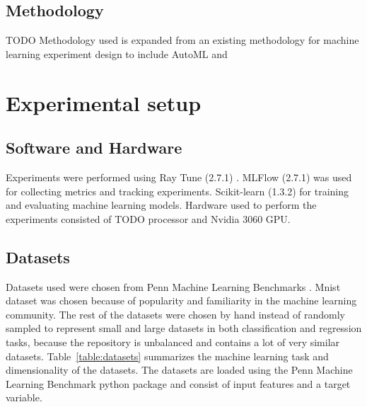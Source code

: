 \subsection{Methodology}
TODO Methodology used is expanded from an existing methodology for machine learning experiment design \parencite{fernandez-lozanoMethodologyDesignExperiments2016} to include AutoML and

\section{Experimental setup}

\subsection{Software and Hardware}

Experiments were performed using Ray Tune (2.7.1) \parencite{liawTuneResearchPlatform2018}. MLFlow (2.7.1) \parencite{chenDevelopmentsMLflowSystem2020} was used for collecting metrics and tracking experiments. Scikit-learn (1.3.2) \parencite{pedregosaScikitlearnMachineLearning2011} for training and evaluating machine learning models. Hardware used to perform the experiments consisted of TODO processor and Nvidia 3060 GPU.

\subsection{Datasets}

Datasets used were chosen from Penn Machine Learning Benchmarks \parencite{olsonPMLBLargeBenchmark2017}. Mnist dataset was chosen because of popularity and familiarity in the machine learning community. The rest of the datasets were chosen by hand instead of randomly sampled to represent small and large datasets in both classification and regression tasks, because the repository is unbalanced and contains a lot of very similar datasets. Table~\ref{table:datasets} summarizes the machine learning task and dimensionality of the datasets. The datasets are loaded using the Penn Machine Learning Benchmark \parencite{olsonPMLBLargeBenchmark2017} python package and consist of input features and a target variable.


